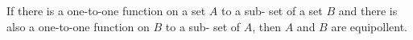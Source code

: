 
\begin{theorem}
    \label{thrm:class1:bernstein}
    If there is a one-to-one function on a set $A$ to a sub-
    set of a set $B$ and there is also a one-to-one function on $B$ to a sub-
    set of $A$, then $A$ and $B$ are equipollent.
\end{theorem}

